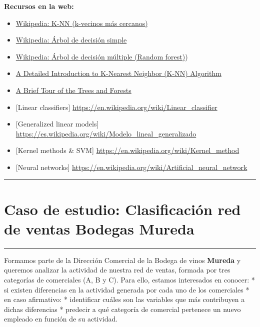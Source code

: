 \documentclass[]{article}
\begin{document}
\textbf{Recursos en la web:}

\begin{itemize}
\item
  \href{https://es.wikipedia.org/wiki/K-vecinos_m\%C3\%A1s_cercanos}{Wikipedia:
  K-NN (k-vecinos más cercanos)}\\
\item
  \href{https://es.wikipedia.org/wiki/\%C3\%81rbol_de_decisi\%C3\%B3n}{Wikipedia:
  Árbol de decisión simple}\\
\item
  \href{https://es.wikipedia.org/wiki/Random_forest}{Wikipedia: Árbol de
  decisión múltiple (Random forest)})
\item
  \href{https://saravananthirumuruganathan.wordpress.com/2010/05/17/a-detailed-introduction-to-k-nearest-neighbor-knn-algorithm/}{A
  Detailed Introduction to K-Nearest Neighbor (K-NN) Algorithm}
\item
  \href{http://www.r-bloggers.com/a-brief-tour-of-the-trees-and-forests/}{A
  Brief Tour of the Trees and Forests}
\item
  {[}Linear classifiers{]}
  \url{https://en.wikipedia.org/wiki/Linear_classifier}
\item
  {[}Generalized linear models{]}
  \url{https://es.wikipedia.org/wiki/Modelo_lineal_generalizado}
\item
  {[}Kernel methods \& SVM{]}
  \url{https://en.wikipedia.org/wiki/Kernel_method}
\item
  {[}Neural networks{]}
  \url{https://en.wikipedia.org/wiki/Artificial_neural_network}
\end{itemize}

\begin{center}\rule{0.5\linewidth}{\linethickness}\end{center}

\section{Caso de estudio: Clasificación red de ventas Bodegas
Mureda}\label{caso-de-estudio-clasificacion-red-de-ventas-bodegas-mureda}

\begin{center}\rule{0.5\linewidth}{\linethickness}\end{center}

Formamos parte de la Dirección Comercial de la Bodega de vinos
\textbf{Mureda} y queremos analizar la actividad de nuestra red de
ventas, formada por tres categorías de comerciales (A, B y C). Para
ello, estamos interesados en conocer: * si existen diferencias en la
actividad generada por cada uno de los comerciales * en caso afirmativo:
* identificar cuáles son las variables que más contribuyen a dichas
diferencias * predecir a qué categoría de comercial pertenece un nuevo
empleado en función de su actividad.
\end{document}

